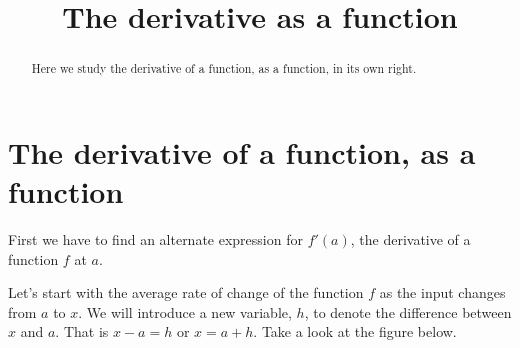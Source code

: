 \documentclass{ximera}
\title[Dig-in:]{The derivative as a function}
\begin{document}
\begin{abstract}
Here we study the derivative of a function, as a function, in its own
right.
\end{abstract}
\maketitle

\section{The derivative of a function, as a function}
First we have to find an alternate expression for $f'(a)$, the derivative of a function $f$  at $a$.

 Let's start with
the average rate of change of the function $f$ as the input changes from $a$ to $x$. We will introduce a new variable, $h$, to denote the difference between $x$ and $a$. That
is $x-a=h$ or $x=a+h$. Take a look at the figure below.
\end{document}
